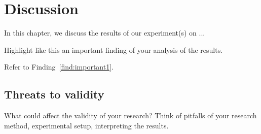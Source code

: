 \chapter{Discussion}
\label{ch:discussion}
In this chapter, we discuss the results of our experiment(s) on ...

\begin{finding}
	Highlight like this an important finding of your analysis of the results.
	\label{find:important1}
\end{finding}

Refer to Finding~\ref{find:important1}.

\section{Threats to validity}
What could affect the validity of your research? Think of pitfalls of your research method, experimental setup, interpreting the results.



